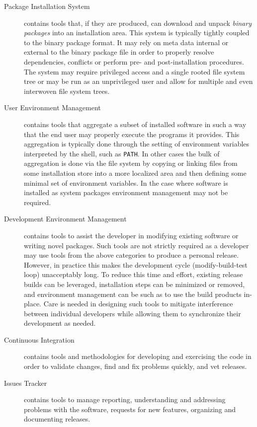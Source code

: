 \begin{description}
\item[Package Installation System] contains tools that, if they are
  produced, can download and unpack \textit{binary packages} into an
  installation area.  This system is typically tightly coupled to the
  binary package format.  It may rely on meta data internal or
  external to the binary package file in order to properly resolve
  dependencies, conflicts or perform pre- and post-installation
  procedures.  The system may require privileged access and a single
  rooted file system tree or may be run as an unprivileged user and
  allow for multiple and even interwoven file system trees.

\item[User Environment Management] contains tools that aggregate a
  subset of installed software in such a way that the end user may
  properly execute the programs it provides.  This aggregation is
  typically done through the setting of environment variables
  interpreted by the shell, such as \texttt{PATH}.  In other cases the
  bulk of aggregation is done via the file system by copying or
  linking files from some installation store into a more localized
  area and then defining some minimal set of environment variables.
  In the case where software is installed as system packages 
  environment management may not be required.

\item[Development Environment Management] contains tools to assist the
  developer in modifying existing software or writing novel packages.
  Such tools are not strictly required as a developer may use tools
  from the above categories to produce a personal release.  However,
  in practice this makes the development cycle (modify-build-test
  loop) unacceptably long.  To reduce this time and effort, existing
  release builds can be leveraged, installation steps can be minimized
  or removed, and environment management can be such as to use the
  build products in-place.  Care is needed in designing such tools to
  mitigate interference between individual developers while allowing
  them to synchronize their development as needed.

\item[Continuous Integration] contains tools and methodologies for
  developing and exercising the code in order to validate changes,
  find and fix problems quickly, and vet releases.

\item[Issues Tracker] contains tools to manage reporting,
  understanding and addressing problems with the software, requests
  for new features, organizing and documenting releases.


\end{description}

